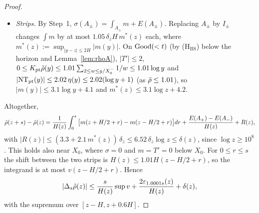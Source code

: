 \begin{proof}
\begin{itemize}
\item \emph{Strips.} By Step~1, $\sigma(A_\pm)=\int_{A_\pm}m+E(A_\pm)$. Replacing $A_\pm$ by $I_\pm$ changes $\int m$ by at most
  $1.05\,\delta_zH\,m^*(z)$ each, where $m^*(z):=\sup_{|y-z|\le2H}|m(y)|$. On $\mathrm{Good}(<t)$ (by \textup{(H$_{\mathrm{BS}}$)} below the horizon and Lemma~\ref{lem:rhoA}), $|T'|\le2$,
  $0\le K_{\mathrm{pt}}\tilde\rho(y)\le1.01\sum_{2\le w\le y/X_0^{-}}1/w\le1.01\log y$ and $|\mathrm{NT}_{\mathrm{pt}}(y)|\le2.02\,\eta(y)\le2.02(\log y+1)$
  (as $\tilde\rho\le1.01$), so $|m(y)|\le3.1\log y+4.1$ and $m^*(z)\le3.1\log z+4.2$.
\end{itemize}
Altogether,
\[
  \tilde\rho(z+s)-\tilde\rho(z)=\frac1{H(z)}\int_0^s\big[m(z+H/2+r)-m(z-H/2+r)\big]dr+\frac{E(A_+)-E(A_-)}{H(z)}+R(z),
\]
with $|R(z)|\le(3.3+2.1\,m^*(z))\,\delta_z\le6.52\,\delta_z\log z\le\delta(z)$, since $\log z\ge10^8$. This holds also near
$X_0$, where $\sigma=0$ and $m=T'=0$ below $X_0$. For $0\le r\le s$ the shift between the two strips is
$H(z)\le1.01H(z-H/2+r)$, so the integrand is at most $v(z-H/2+r)$. Hence
\[
  |\Delta_s\tilde\rho(z)|\le\frac s{H(z)}\sup v+\frac{2\varepsilon_{1.0001s}(z)}{H(z)}+\delta(z),
\]
with the supremum over $[z-H,z+0.6H]$.


\end{proof}
